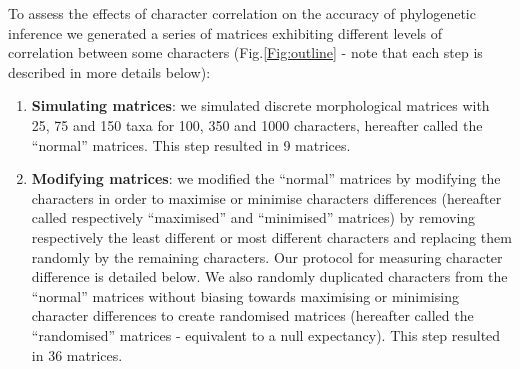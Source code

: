 \documentclass[12pt,letterpaper]{article}
\begin{document}
To assess the effects of character correlation on the accuracy of phylogenetic inference we generated a series of matrices exhibiting different levels of correlation between some characters (Fig.\ref{Fig:outline} - note that each step is described in more details below):
\begin{enumerate}
    \item \textbf{Simulating matrices}: we simulated discrete morphological matrices with 25, 75 and 150 taxa for 100, 350 and 1000 characters, hereafter called the ``normal'' matrices. This step resulted in 9 matrices.

    \item \textbf{Modifying matrices}: we modified the ``normal'' matrices by modifying the characters in order to maximise or minimise characters differences (hereafter called respectively ``maximised'' and ``minimised'' matrices) by removing respectively the least different or most different characters and replacing them randomly by the remaining characters. Our protocol for measuring character difference is detailed below.
    We also randomly duplicated characters from the ``normal'' matrices without biasing towards maximising or minimising character differences to create randomised matrices (hereafter called the ``randomised'' matrices - equivalent to a null expectancy). This step resulted in 36 matrices.


\end{enumerate}
\end{document}
